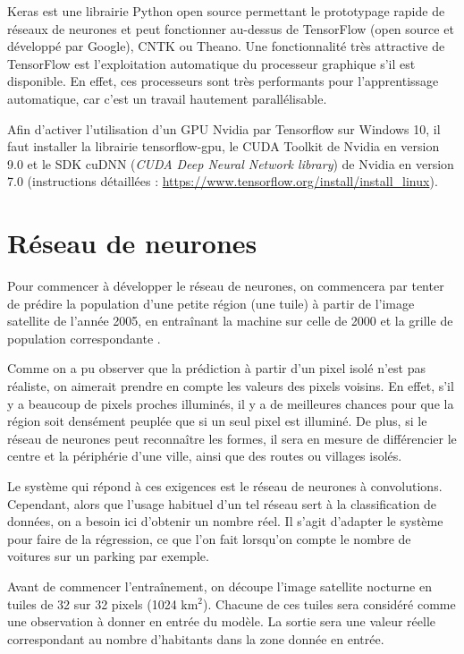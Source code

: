 \documentclass[a4paper, 11pt]{report}
\begin{document}
Keras est une librairie Python open source permettant le prototypage rapide de réseaux de neurones et peut fonctionner au-dessus de TensorFlow (open source et développé par Google), CNTK ou Theano. Une fonctionnalité très attractive de TensorFlow est l'exploitation automatique du processeur graphique s'il est disponible. En effet, ces processeurs sont très performants pour l'apprentissage automatique, car c'est un travail hautement parallélisable.

Afin d'activer l'utilisation d'un GPU Nvidia par Tensorflow sur Windows 10, il faut installer la librairie tensorflow-gpu, le CUDA Toolkit de Nvidia en version 9.0 et le SDK cuDNN (\textit{CUDA Deep Neural Network library}) de Nvidia en version 7.0 (instructions détaillées : \url{https://www.tensorflow.org/install/install_linux}).

\section{Réseau de neurones}
Pour commencer à développer le réseau de neurones, on commencera par tenter de prédire la population d'une petite région (une tuile) à partir de l'image satellite de l'année 2005, en entraînant la machine sur celle de 2000 et la grille de population correspondante \cite{sedac}.

Comme on a pu observer que la prédiction à partir d'un pixel isolé n'est pas réaliste, on aimerait prendre en compte les valeurs des pixels voisins. En effet, s'il y a beaucoup de pixels proches illuminés, il y a de meilleures chances pour que la région soit densément peuplée que si un seul pixel est illuminé. De plus, si le réseau de neurones peut reconnaître les formes, il sera en mesure de différencier le centre et la périphérie d'une ville, ainsi que des routes ou villages isolés.

Le système qui répond à ces exigences est le réseau de neurones à convolutions. Cependant, alors que l'usage habituel d'un tel réseau sert à la classification de données, on a besoin ici d'obtenir un nombre réel. Il s'agit d'adapter le système pour faire de la régression, ce que l'on fait lorsqu'on compte le nombre de voitures sur un parking par exemple.

Avant de commencer l'entraînement, on découpe l'image satellite nocturne en tuiles de 32 sur 32 pixels (1024 km$^2$). Chacune de ces tuiles sera considéré comme une observation à donner en entrée du modèle. La sortie sera une valeur réelle correspondant au nombre d'habitants dans la zone donnée en entrée.
\end{document}
